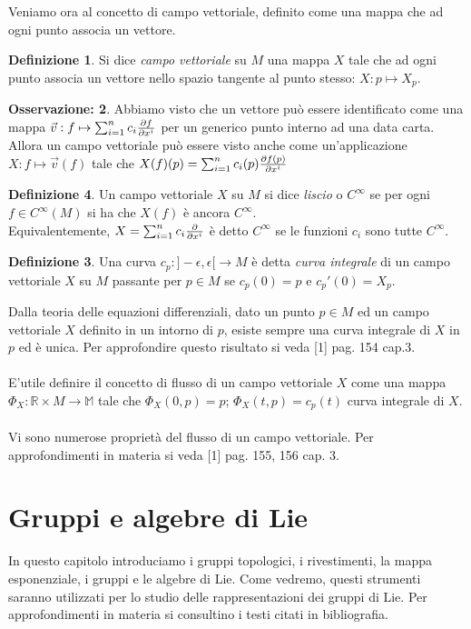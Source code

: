 \documentclass[12pt,a4paper]{report}
\theoremstyle{definition}
\newtheorem{Def}{Definizione}[chapter]
\theoremstyle{definition}
\theoremstyle{definition}
\theoremstyle{definition}
\newtheorem{Obs}[Def]{Osservazione:}
\begin{document}
Veniamo ora al concetto di campo vettoriale, definito come una mappa che ad ogni punto associa un vettore.
\begin{Def}
	Si dice \textit{campo vettoriale} su $M$ una mappa $X$ tale che ad ogni punto associa un vettore nello spazio tangente al punto stesso: $X:p\mapsto X_p$. 
\end{Def}
\begin{Obs}
	Abbiamo visto che un vettore può essere identificato come una mappa $\vec{v}:f\mapsto\sum_{i=1}^{n}c_i{\partial f\over \partial x^i}$ per un generico punto interno ad una data carta. Allora un campo vettoriale può essere visto anche come un'applicazione $X:f\mapsto\vec{v}(f)$ tale che $X(f)(p)=\sum_{i=1}^{n}c_i(p){\partial f(p)\over \partial x^i}$
\end{Obs}
\begin{Def}
	Un campo vettoriale $X$ su $M$ si dice \textit{liscio} o $C^\infty$ se per ogni $f\in C^\infty(M)$ si ha che $X(f)$ è ancora $C^\infty$.
\\
Equivalentemente, $X=\sum_{i=1}^{n}c_i{\partial\over \partial x^i}$ è detto $C^\infty$ se le funzioni $c_i$ sono tutte $C^\infty$.
\begin{Def}
	Una curva $c_p:]-\epsilon,\epsilon[\rightarrow M$ è detta \textit{curva integrale} di un campo vettoriale $X$ su $M$ passante per $p\in M$ se $c_p(0)=p$ e $c_p'(0)=X_p$.
\end{Def}
Dalla teoria delle equazioni differenziali, dato un punto $p\in M$ ed un campo vettoriale $X$ definito in un intorno di $p$, esiste sempre una curva integrale di $X$ in $p$ ed è unica. Per approfondire questo risultato si veda [1] pag. 154 cap.3.\\
\\
E'utile definire il concetto di flusso di un campo vettoriale $X$ come una mappa $\Phi_X:\mathbb{R}\times M\rightarrow\mathbb{M}$ tale che $\Phi_X(0,p)=p$; $\Phi_X(t,p)=c_p(t)$ curva integrale di $X$.\\
\\
Vi sono numerose proprietà del flusso di un campo vettoriale. Per approfondimenti in materia si veda [1] pag. 155, 156 cap. 3.
\end{Def}
\chapter{Gruppi e algebre di Lie}
In questo capitolo introduciamo i gruppi topologici, i rivestimenti, la mappa esponenziale, i gruppi e le algebre di Lie. Come vedremo, questi strumenti saranno utilizzati per lo studio delle rappresentazioni dei gruppi di Lie. Per approfondimenti in materia si consultino i testi citati in bibliografia.
\end{document}
